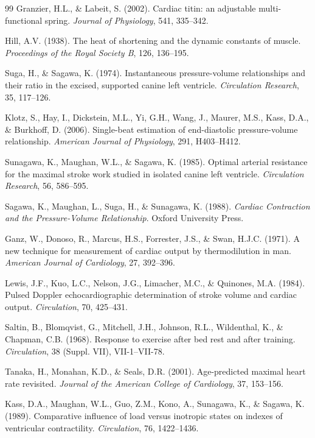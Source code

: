 \documentclass[10pt,twocolumn,a4paper]{article}
\theoremstyle{remark}
\begin{document}
\begin{thebibliography}{99}
Granzier, H.L., \& Labeit, S. (2002). Cardiac titin: an adjustable multi-functional spring. \textit{Journal of Physiology}, 541, 335--342.

Hill, A.V. (1938). The heat of shortening and the dynamic constants of muscle. \textit{Proceedings of the Royal Society B}, 126, 136--195.

Suga, H., \& Sagawa, K. (1974). Instantaneous pressure-volume relationships and their ratio in the excised, supported canine left ventricle. \textit{Circulation Research}, 35, 117--126.

Klotz, S., Hay, I., Dickstein, M.L., Yi, G.H., Wang, J., Maurer, M.S., Kass, D.A., \& Burkhoff, D. (2006). Single-beat estimation of end-diastolic pressure-volume relationship. \textit{American Journal of Physiology}, 291, H403--H412.

Sunagawa, K., Maughan, W.L., \& Sagawa, K. (1985). Optimal arterial resistance for the maximal stroke work studied in isolated canine left ventricle. \textit{Circulation Research}, 56, 586--595.

Sagawa, K., Maughan, L., Suga, H., \& Sunagawa, K. (1988). \textit{Cardiac Contraction and the Pressure-Volume Relationship}. Oxford University Press.

Ganz, W., Donoso, R., Marcus, H.S., Forrester, J.S., \& Swan, H.J.C. (1971). A new technique for measurement of cardiac output by thermodilution in man. \textit{American Journal of Cardiology}, 27, 392--396.

Lewis, J.F., Kuo, L.C., Nelson, J.G., Limacher, M.C., \& Quinones, M.A. (1984). Pulsed Doppler echocardiographic determination of stroke volume and cardiac output. \textit{Circulation}, 70, 425--431.

Saltin, B., Blomqvist, G., Mitchell, J.H., Johnson, R.L., Wildenthal, K., \& Chapman, C.B. (1968). Response to exercise after bed rest and after training. \textit{Circulation}, 38 (Suppl. VII), VII-1--VII-78.

Tanaka, H., Monahan, K.D., \& Seals, D.R. (2001). Age-predicted maximal heart rate revisited. \textit{Journal of the American College of Cardiology}, 37, 153--156.

Kass, D.A., Maughan, W.L., Guo, Z.M., Kono, A., Sunagawa, K., \& Sagawa, K. (1989). Comparative influence of load versus inotropic states on indexes of ventricular contractility. \textit{Circulation}, 76, 1422--1436.


\end{thebibliography}
\end{document}
